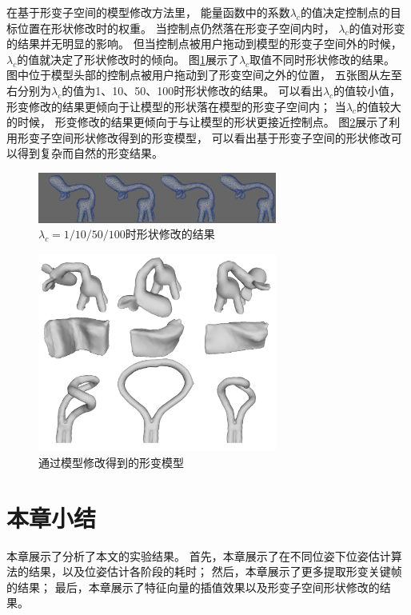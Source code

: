 在基于形变子空间的模型修改方法里，
能量函数中的系数$\lambda_c$的值决定控制点的目标位置在形状修改时的权重。
当控制点仍然落在形变子空间内时，
$\lambda_c$的值对形变的结果并无明显的影响。
但当控制点被用户拖动到模型的形变子空间外的时候，
$\lambda_c$的值就决定了形状修改时的倾向。
图\ref{different_lambda}展示了$\lambda_c$取值不同时形状修改的结果。
图中位于模型头部的控制点被用户拖动到了形变空间之外的位置，
五张图从左至右分别为$\lambda_c$的值为1、10、50、100时形状修改的结果。
可以看出$\lambda_c$的值较小值，
形变修改的结果更倾向于让模型的形状落在模型的形变子空间内；
当$\lambda_c$的值较大的时候，
形变修改的结果更倾向于与让模型的形状更接近控制点。
图\ref{edit_result}展示了利用形变子空间形状修改得到的形变模型，
可以看出基于形变子空间的形状修改可以得到复杂而自然的形变结果。
\begin{figure}
    \centering
    \includegraphics[width = 0.7\textwidth]{./Pictures/different_lambda.png}
    \caption{$\lambda_c=1/10/50/100$时形状修改的结果}
    \label{different_lambda}
\end{figure}
\begin{figure}
    \centering
    \includegraphics[width = 0.7\textwidth]{./Pictures/edit_result_p_only.png}
    \caption{通过模型修改得到的形变模型}
    \label{edit_result}
\end{figure}
\section{本章小结}
本章展示了分析了本文的实验结果。
首先，本章展示了在不同位姿下位姿估计算法的结果，以及位姿估计各阶段的耗时；
然后，本章展示了更多提取形变关键帧的结果；
最后，本章展示了特征向量的插值效果以及形变子空间形状修改的结果。